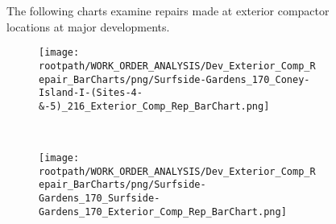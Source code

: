 \begin{figure}[h]
                                \sf
                                \raggedright
                                The following charts examine repairs made at exterior compactor locations at major developments.
                                \sf
                                \begin{subfigure}{0.45\textwidth}
                                        \texttt{[image: \\rootpath/WORK\_ORDER\_ANALYSIS/Dev\_Exterior\_Comp\_Repair\_BarCharts/png/Surfside-Gardens\_170\_Coney-Island-I-(Sites-4-\&-5)\_216\_Exterior\_Comp\_Rep\_BarChart.png]}
                                        \end{subfigure}
                                        ~
                                        \begin{subfigure}{0.45\textwidth}
                                        \texttt{[image: \\rootpath/WORK\_ORDER\_ANALYSIS/Dev\_Exterior\_Comp\_Repair\_BarCharts/png/Surfside-Gardens\_170\_Surfside-Gardens\_170\_Exterior\_Comp\_Rep\_BarChart.png]}
                                        \end{subfigure}
                                        
                                        \end{figure}
